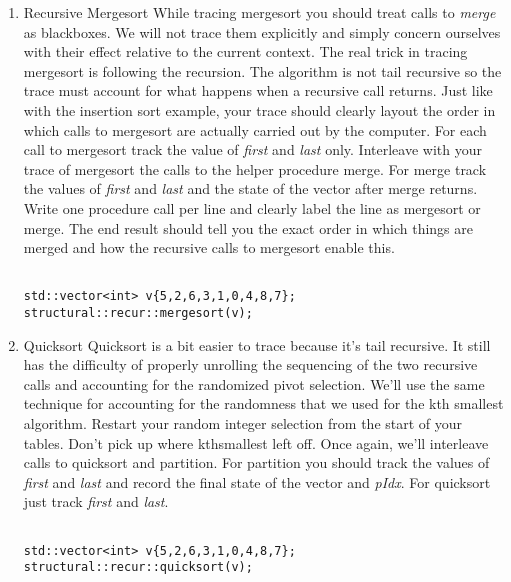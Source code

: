 \documentclass[10pt]{article}
\begin{document}
\begin{enumerate}
\item Recursive Mergesort \newline
While tracing mergesort you should treat calls to \textit{merge} as blackboxes. We will not trace them explicitly and simply concern ourselves with their effect relative to the current context. The real trick in tracing mergesort is following the recursion. The algorithm is not tail recursive so the trace must account for what happens when a recursive call returns. Just like with the insertion sort example, your trace should clearly layout the order in which calls to mergesort are actually carried out by the computer. For each call to mergesort track the value of \textit{first} and \textit{last} only. Interleave with your trace of mergesort the calls to the helper procedure merge. For merge track the values of \textit{first} and \textit{last} and the state of the vector after merge returns. Write one procedure call per line and clearly label the line as mergesort or merge. The end result should tell you the exact order in which things are merged and how the recursive calls to mergesort enable this.
\begin{lstlisting}

std::vector<int> v{5,2,6,3,1,0,4,8,7};
structural::recur::mergesort(v);

\end{lstlisting}


\newpage \thispagestyle{empty}
\hspace{1in}
\newpage \thispagestyle{empty}


\item Quicksort %
Quicksort is a bit easier to trace because it's tail recursive. It still has the difficulty of properly unrolling the sequencing of the two recursive calls and accounting for the randomized pivot selection. We'll use the same technique for accounting for the randomness that we used for the kth smallest algorithm. Restart your random integer selection from the start of your tables. Don't pick up where kthsmallest left off. Once again, we'll interleave calls to quicksort and partition. For partition you should track the values of \textit{first} and \textit{last} and record the final state of the vector and \textit{pIdx}. For quicksort just track \textit{first} and \textit{last}.

\begin{lstlisting}

std::vector<int> v{5,2,6,3,1,0,4,8,7};
structural::recur::quicksort(v);

\end{lstlisting}

\end{enumerate}
\end{document}
